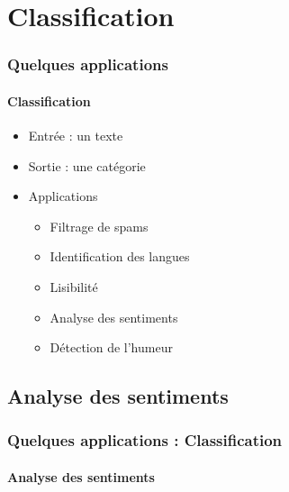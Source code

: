 \documentclass[xcolor=table]{beamer}
\begin{document}
\section{Classification}

\begin{frame}
	\frametitle{Quelques applications}
	\framesubtitle{Classification}
	
	\begin{itemize}
		\item Entrée : un texte
		\item Sortie : une catégorie
		\item Applications 
		\begin{itemize}
			\item Filtrage de spams
			\item Identification des langues
			\item Lisibilité 
			\item Analyse des sentiments
			\item Détection de l'humeur
		\end{itemize}
	\end{itemize}

\end{frame}

\subsection{Analyse des sentiments}

\begin{frame}
	\frametitle{Quelques applications : Classification}
	\framesubtitle{Analyse des sentiments}
\end{frame}
\end{document}
